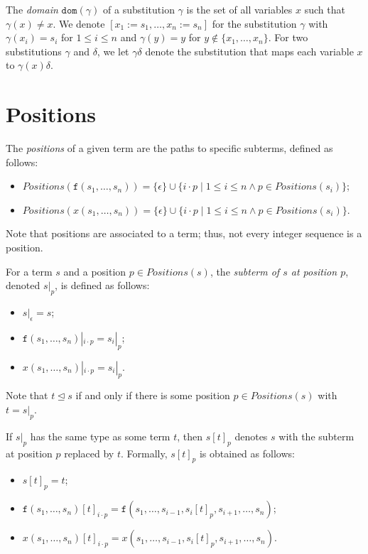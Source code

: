 \documentclass{lmcs}
\theoremstyle{theorem}\newtheorem{theorem}{Theorem}
\theoremstyle{theorem}\newtheorem{lemma}[theorem]{Lemma}
\theoremstyle{theorem}\newtheorem{corollary}[theorem]{Corollary}
\theoremstyle{definition}\newtheorem{definition}[theorem]{Definition}
\theoremstyle{definition}\newtheorem{example}[theorem]{Example}
\newcommand{\domain}{\mathtt{dom}}
\newcommand{\identifier}[1]{\mathtt{#1}}
\newcommand{\afun}{\identifier{f}}
\newcommand{\avar}{x}
\newcommand{\subtermeq}{\unlhd}
\begin{document}
The \emph{domain} $\domain(\gamma)$ of a substitution $\gamma$ is the set of all variables $x$
such that $\gamma(x) \neq x$.
We denote $[x_1:=s_1,\dots,x_n:=s_n]$ for the substitution $\gamma$ with $\gamma(x_i) = s_i$ for
$1 \leq i \leq n$ and $\gamma(y) = y$ for $y \notin \{x_1,\dots,x_n\}$.
For two substitutions $\gamma$ and $\delta$, we let $\gamma\delta$ denote the substitution that
maps each variable $x$ to $\gamma(x)\delta$.

\section{Positions}

The \emph{positions} of a given term are the paths to specific subterms, defined as follows:

\begin{itemize}
\item $\mathit{Positions}(\afun(s_1,\dots,s_n)) = \{ \epsilon \} \cup \{ i \cdot p \mid 1 \leq i
  \leq n \wedge p \in \mathit{Positions}(s_i) \}$;
\item $\mathit{Positions}(\avar(s_1,\dots,s_n)) = \{ \epsilon \} \cup \{ i \cdot p \mid 1 \leq i
  \leq n \wedge p \in \mathit{Positions}(s_i) \}$.
\end{itemize}
Note that positions are associated to a term; thus, not every integer sequence is a position.

For a term $s$ and a position $p \in \mathit{Positions}(s)$, the \emph{subterm of $s$ at position
$p$}, denoted $s|_p$, is defined as follows:
\begin{itemize}
\item $s|_\epsilon = s$;
\item $\afun(s_1,\dots,s_n)|_{i \cdot p} = s_i|_p$;
\item $\avar(s_1,\dots,s_n)|_{i \cdot p} = s_i|_p$.
\end{itemize}

Note that $t \subtermeq s$ if and only if there is some position $p \in \mathit{Positions}(s)$ with
$t = s|_p$.

If $s|_p$ has the same type as some term $t$, then $s[t]_p$ denotes $s$ with the subterm at position
$p$ replaced by $t$.  Formally, $s[t]_p$ is obtained as follows:
\begin{itemize}
\item $s[t]_p = t$;
\item $\afun(s_1,\dots,s_n)[t]_{i \cdot p} = \afun(s_1,\dots,s_{i-1},s_i[t]_p,s_{i+1},\dots,s_n)$;
\item $\avar(s_1,\dots,s_n)[t]_{i \cdot p} = \avar(s_1,\dots,s_{i-1},s_i[t]_p,s_{i+1},\dots,s_n)$.
\end{itemize}
\end{document}
